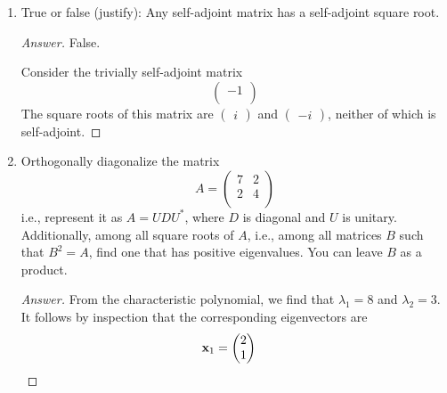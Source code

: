 \documentclass[../psets.tex]{subfiles}
\begin{document}
\begin{enumerate}[label={\textbf{2.\arabic*.}}]
\begin{proof}[Answer]
\begin{align*}
            &= UDD^*U^*&
                &= UD^*DU^*
        \end{align*}
        Additionally, we have that $D^*D=DD^*$ \parencite[167]{bib:Treil}, completing the proof.
    \end{proof}
    \item True or false (justify): Any self-adjoint matrix has a self-adjoint square root.
    \begin{proof}[Answer]
        False.\par
        Consider the trivially self-adjoint matrix
        \begin{equation*}
            \begin{pmatrix}
                -1\\
            \end{pmatrix}
        \end{equation*}
        The square roots of this matrix are $
            \begin{pmatrix}
                i
            \end{pmatrix}
        $ and $
            \begin{pmatrix}
                -i
            \end{pmatrix}
        $, neither of which is self-adjoint.
    \end{proof}
    \item Orthogonally diagonalize the matrix
    \begin{equation*}
        A =
        \begin{pmatrix}
            7 & 2\\
            2 & 4\\
        \end{pmatrix}
    \end{equation*}
    i.e., represent it as $A=UDU^*$, where $D$ is diagonal and $U$ is unitary. Additionally, among all square roots of $A$, i.e., among all matrices $B$ such that $B^2=A$, find one that has positive eigenvalues. You can leave $B$ as a product.
    \begin{proof}[Answer]
        From the characteristic polynomial, we find that $\lambda_1=8$ and $\lambda_2=3$. It follows by inspection that the corresponding eigenvectors are
        \begin{align*}
            \x_1 &=
            \begin{pmatrix}
                2\\
                1\\
            \end{pmatrix}&

\end{align*}
\end{proof}
\end{enumerate}
\end{document}
